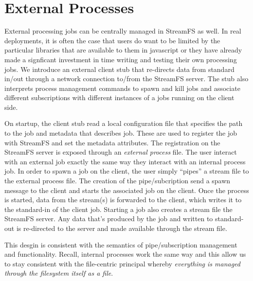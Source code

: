 \section{External Processes}
\label{sec:externalprocs}

External processing jobs can be centrally managed in StreamFS as well.  In real deployments, it is often the case that
users do want to be limited by the particular libraries that are available to them in javascript or they have already made
a signficant investment in time writing and testing their own processing jobs.  We introduce an external client stub that 
re-directs data from standard in/out through a network connection to/from the StreamFS server.  The stub also interprets
process management commands to spawn and kill jobs and associate different subscriptions with different instances of a jobs 
running on the client side.

On startup, the client stub read a local configuration file that specifies the path to the job and metadata that describes
job.  These are used to register the job with StreamFS and set the metadata attributes.  The registration on the StreamFS 
server is exposed through an \emph{external process} file.  The user interact with an external job exactly the same way they
interact with an internal process job.  In order to spawn a job on the client, the user simply ``pipes'' a stream file 
to the external process file.  The creation of the pipe/subcription send a spawn message to the client and starts the associated
job on the client.  Once the process is started, data from the stream(s) is forwarded to the client, which writes it to the 
standard-in of the client job.  Starting a job also creates a stream file the StreamFS server.  Any data that's produced by the job
and written to standard-out is re-directed to the server and made available through the stream file.

This desgin is consistent with the semantics of pipe/subscription management and functionality.  Recall, internal processes
work the same way and this allow us to stay consistent with the file-centric principal whereby \emph{everything is managed
through the filesystem itself as a file}.


